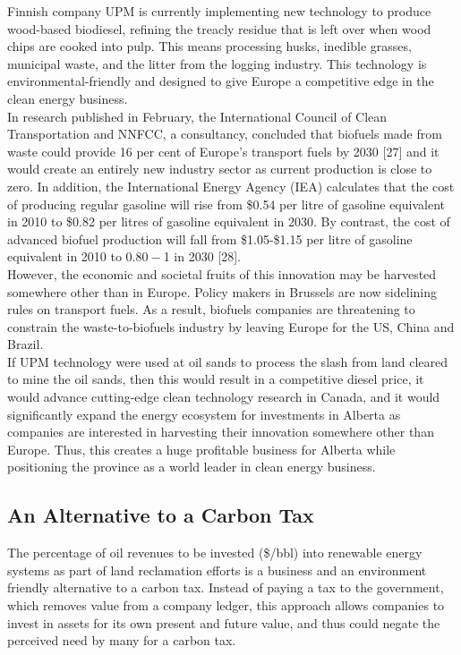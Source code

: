 \documentclass[12pt]{article}
\begin{document}
Finnish company UPM is currently implementing new technology to produce wood-based biodiesel, refining the treacly residue that is left over when wood chips are cooked into pulp. This means processing husks, inedible grasses, municipal waste, and the litter from the logging industry. This technology is environmental-friendly and designed to give Europe a competitive edge in the clean energy business. \\

In research published in February, the International Council of Clean Transportation and NNFCC, a consultancy, concluded that biofuels made from waste could provide 16 per cent of Europe’s transport fuels by 2030 [27] and it would create an entirely new industry sector as current production is close to zero. In addition, the International Energy Agency (IEA) calculates that the cost of producing regular gasoline will rise from \$0.54 per litre of gasoline equivalent in 2010 to \$0.82 per litres of gasoline equivalent in 2030. By contrast, the cost of advanced biofuel production will fall from \$1.05-\$1.15 per litre of gasoline equivalent in 2010 to $0.80-$1 in 2030 [28].\\

However, the economic and societal fruits of this innovation may be harvested somewhere other than in Europe. Policy makers in Brussels are now sidelining rules on transport fuels. As a result, biofuels companies are threatening to constrain the waste-to-biofuels industry by leaving Europe for the US, China and Brazil.  \\

If UPM technology were used at oil sands to process the slash from land cleared to mine the oil sands, then this would result in a competitive diesel price, it would advance cutting-edge clean technology research in Canada, and it would significantly expand the energy ecosystem for investments in Alberta as companies are interested in harvesting their innovation somewhere other than Europe. Thus, this creates a huge profitable business for Alberta while positioning the province as a world leader in clean energy business.  


\subsection{An Alternative to a Carbon Tax}

The percentage of oil revenues to be invested (\$/bbl) into renewable energy systems as part of land reclamation efforts is a business and an environment friendly alternative to a carbon tax. Instead of paying a tax to the government, which removes value from a company ledger, this approach allows companies to invest in assets for its own present and future value, and thus could negate the perceived need by many for a carbon tax. \\
\end{document}
